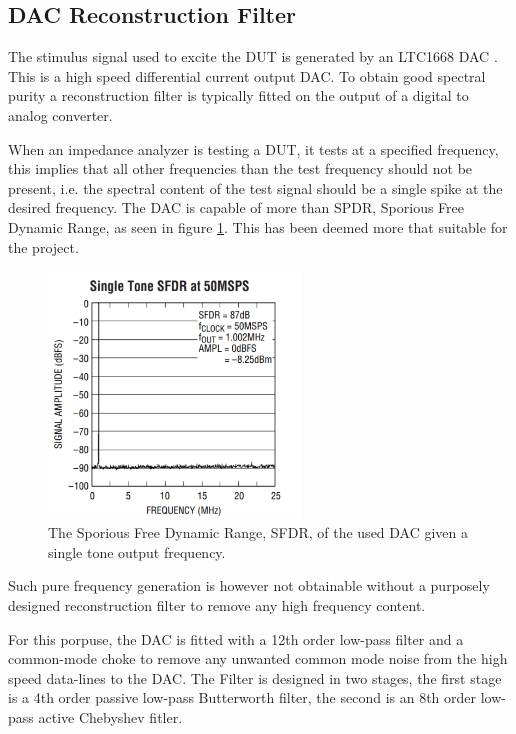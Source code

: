 \subsection{DAC Reconstruction Filter} \label{subsec:DAC_Filter}
The stimulus signal used to excite the DUT is generated by an LTC1668 DAC \cite{DAC_LTC1668}. This is a high speed differential current output DAC. To obtain good spectral purity a reconstruction filter is typically fitted on the output of a digital to analog converter.

When an impedance analyzer is testing a DUT, it tests at a specified frequency, this implies that all other frequencies than the test frequency should not be present, i.e. the spectral content of the test signal should be a single spike at the desired frequency. The DAC is capable of more than  SPDR, Sporious Free Dynamic Range, as seen in figure \ref{fig_7_1_1_SFDR}. This has been deemed more that suitable for the project. 

\begin{figure}[H]
    \centering
    \includegraphics[clip, trim=0 0 0 0, width=0.6\textwidth]{Sections/7_SystemDesign/Figures/7_1_1_DAC_SingleTone_SFDR.pdf}
    \caption{The Sporious Free Dynamic Range, SFDR, of the used DAC given a single tone output frequency.}
    \label{fig_7_1_1_SFDR}
\end{figure}

Such pure frequency generation is however not obtainable without a purposely designed reconstruction filter to remove any high frequency content.

For this porpuse, the DAC is fitted with a 12th order low-pass filter and a common-mode choke to remove any unwanted common mode noise from the high speed data-lines to the DAC. The Filter is designed in two stages, the first stage is a 4th order passive low-pass Butterworth filter, the second is an 8th order low-pass active Chebyshev fitler.

